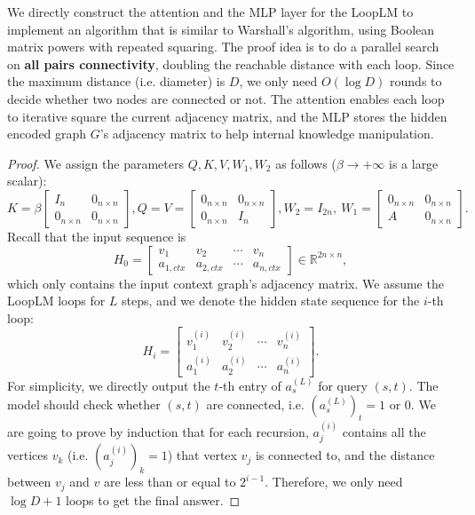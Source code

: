 \documentclass[]{bytedance_seed}
\newcommand{\R}{\mathbb{R}}
\newcommand{\1}{\mathbf{1}}
\newcommand{\ut}{LoopLM}
\begin{document}
{We directly construct the attention and the MLP layer for the \ut{} to implement an algorithm that is similar to Warshall’s algorithm, using Boolean matrix powers with repeated squaring. The proof idea is to do a parallel search on \textbf{all pairs connectivity}, doubling the reachable distance with each loop. Since the maximum distance (i.e. diameter) is $D$, we only need $O(\log D)$ rounds to decide whether two nodes are connected or not. The attention enables each loop to iterative square the current adjacency matrix, and the MLP stores the hidden encoded graph $G$'s adjacency matrix to help internal knowledge manipulation.
\begin{proof}
    We assign the parameters $Q,K,V,W_1,W_2$ as follows ($\beta\to +\infty$ is a large scalar):
    $$K=\beta\begin{bmatrix}
        I_n&0_{n\times n}\\0_{n\times n}&0_{n\times n}
    \end{bmatrix}, Q= V=\begin{bmatrix}
        0_{n\times n}&0_{n\times n}\\
        0_{n\times n}&I_n
    \end{bmatrix}, W_2 = I_{2n},\ W_1 = \begin{bmatrix}
        0_{n\times n}&0_{n\times n}\\
        A&0_{n\times n}
    \end{bmatrix}.$$
    Recall that the input sequence is
    $$H_0=\begin{bmatrix}
    v_1 &v_2&\cdots&v_n\\
    a_{1,ctx}&a_{2,ctx}&\cdots&a_{n,ctx}\end{bmatrix}\in \R^{2n\times n},$$
    which only contains the input context graph's adjacency matrix.
    We assume the \ut{} loops for $L$ steps, and we denote the hidden state sequence for the $i$-th loop:
    $$H_i=\begin{bmatrix}
        v_1^{(i)} &v_2^{(i)}&\cdots&v_n^{(i)}\\
        a_{1}^{(i)}&a_{2}^{(i)}&\cdots&a_{n}^{(i)}\end{bmatrix}.$$
    For simplicity, we directly output the $t$-th entry of $a_{s}^{(L)}$ for query $(s,t)$.
    The model should check whether $(s,t)$ are connected, i.e. $(a_s^{(L)})_t=1$ or $0$.
    We are going to prove by induction that for each recursion, $a_j^{(i)}$ contains all the vertices $v_k$ (i.e. $(a_j^{(i)})_k=1$)  that vertex $v_j$ is connected to, and the distance between $v_j$ and $v$ are less than or equal to $2^{i-1}$. Therefore, we only need $\log D+1$ loops to get the final answer. 


\end{proof}}
\end{document}
